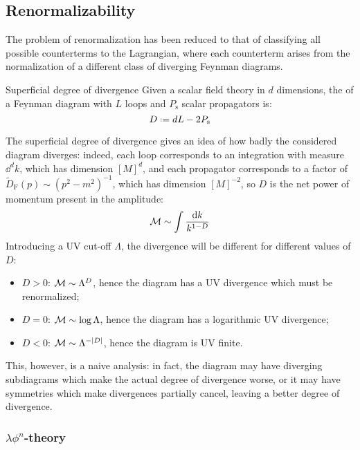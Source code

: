 \subsection{Renormalizability}

The problem of renormalization has been reduced to that of classifying all possible counterterms to the Lagrangian, where each counterterm arises from the normalization of a different class of diverging Feynman diagrams.

\begin{definition}{Superficial degree of divergence}{}
  Given a scalar field theory in $ d $ dimensions, the  of a Feynman diagram with $ L $ loops and $ P_\text{s} $ scalar propagators is:
  \begin{equation}
    D \defeq d L - 2 P_\text{s}
    \label{eq:sup-deg-div-def}
  \end{equation}
\end{definition}

The superficial degree of divergence gives an idea of how badly the considered diagram diverges: indeed, each loop corresponds to an integration with measure $ \dd^dk $, which has dimension $ [M]^d $, and each propagator corresponds to a factor of $ \tilde{D}_\text{F}(p) \sim (p^2 - m^2)^{-1} $, which has dimension $ [M]^{-2} $, so $ D $ is the net power of momentum present in the amplitude:
\begin{equation*}
  \mathcal{M} \sim \int \frac{\mathrm{d} k}{k^{1-D}}
\end{equation*}
Introducing a UV cut-off $ \Lambda $, the divergence will be different for different values of $ D $:
\begin{itemize}
  \item $ D > 0 $: $ \mathcal{M} \sim \Lambda^D $, hence the diagram has a UV divergence which must be renormalized;
  \item $ D = 0 $: $ \mathcal{M} \sim \log \Lambda $, hence the diagram has a logarithmic UV divergence;
  \item $ D < 0 $: $ \mathcal{M} \sim \Lambda^{-\left\lvert D\right\rvert} $, hence the diagram is UV finite.
\end{itemize}
This, however, is a naive analysis: in fact, the diagram may have diverging subdiagrams which make the actual degree of divergence worse, or it may have symmetries which make divergences partially cancel, leaving a better degree of divergence.

\subsubsection{\texorpdfstring{$ \lambda \phi^n $}{λφn}-theory}


